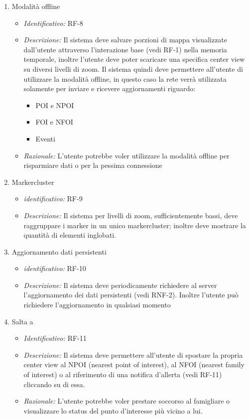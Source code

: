 \begin{enumerate}
    \item Modalità offline
  \begin{itemize}
  \item\textit{Identificativo:} RF-8
  \item\textit{Descrizione:} Il sistema deve salvare porzioni di mappa visualizzate dall’utente attraverso l’interazione base (vedi RF-1) nella memoria temporale, inoltre l’utente deve poter scaricare una specifica center view su diversi livelli di zoom. Il sistema quindi deve permettere all’utente di utilizzare la modalità offline, in questo caso la rete verrà utilizzata solamente per inviare e ricevere aggiornamenti riguardo:
    \begin{itemize}
    \item POI e NPOI
    \item FOI e NFOI
    \item Eventi
    \end{itemize}
   \item\textit{Razionale:} L’utente potrebbe voler utilizzare la modalità offline per risparmiare dati o per la  pessima connessione
  \end{itemize}
  
   \item Markercluster
  \begin{itemize}
  \item\textit{identificativo:} RF-9
  \item\textit{Descrizione:} Il sistema per livelli di zoom, sufficientemente bassi, deve raggruppare i marker in un unico markercluster; inoltre deve mostrare la quantità di elementi inglobati.
  \end{itemize}
  
    \item Aggiornamento dati persistenti
  \begin{itemize}
  \item\textit{identificativo:} RF-10
  \item\textit{Descrizione:} Il sistema deve periodicamente richiedere al server l’aggiornamento dei dati persistenti (vedi RNF-2).
Inoltre l’utente può richiedere l’aggiornamento in qualsiasi momento
  \end{itemize}
  
   \item Salta a
  \begin{itemize}
  \item\textit{Identificativo:} RF-11
  \item\textit{Descrizione:} Il sistema deve permettere all’utente di spostare la propria center view al NPOI (nearest point of interest), al NFOI (nearest family of interest) o al riferimento di una notifica d’allerta (vedi RF-11) cliccando su di essa.
   \item\textit{Razionale:} L’utente potrebbe voler prestare soccorso al famigliare o visualizzare lo status del punto d’interesse più vicino a lui.
  \end{itemize}
  

\end{enumerate}
